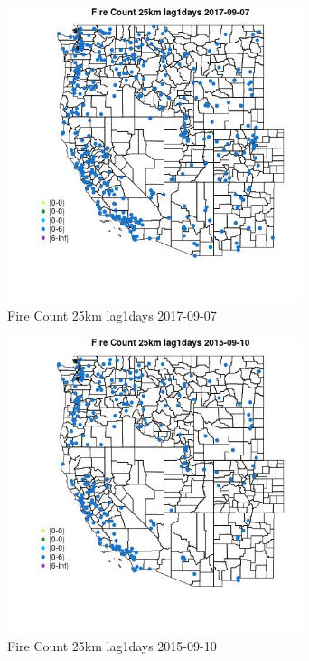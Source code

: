 \begin{figure} 
\centering  
\includegraphics[width=0.77\textwidth]{Code_Outputs/Report_ML_input_PM25_Step4_part_e_de_duplicated_aves_compiled_2019-05-20wNAs_MapObsFire_Count_25km_lag1days2017-09-07.jpg} 
\caption{\label{fig:Report_ML_input_PM25_Step4_part_e_de_duplicated_aves_compiled_2019-05-20wNAsMapObsFire_Count_25km_lag1days2017-09-07}Fire Count 25km lag1days 2017-09-07} 
\end{figure} 
 

\begin{figure} 
\centering  
\includegraphics[width=0.77\textwidth]{Code_Outputs/Report_ML_input_PM25_Step4_part_e_de_duplicated_aves_compiled_2019-05-20wNAs_MapObsFire_Count_25km_lag1days2015-09-10.jpg} 
\caption{\label{fig:Report_ML_input_PM25_Step4_part_e_de_duplicated_aves_compiled_2019-05-20wNAsMapObsFire_Count_25km_lag1days2015-09-10}Fire Count 25km lag1days 2015-09-10} 
\end{figure} 
 

